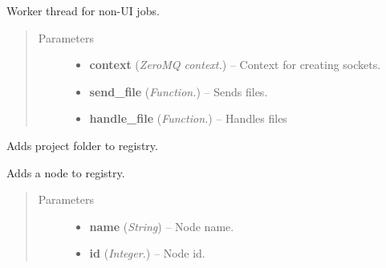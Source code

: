 \documentclass[letterpaper,10pt,english]{sphinxmanual}
\begin{document}
\begin{fulllineitems}
\label{api:wos.WORKER_THREAD}
Worker thread for non-UI jobs.
\begin{quote}\begin{description}
\item[{Parameters}] \leavevmode\begin{itemize}
\item {} 
\textbf{context} (\emph{ZeroMQ context.}) -- Context for creating sockets.

\item {} 
\textbf{send\_file} (\emph{Function.}) -- Sends files.

\item {} 
\textbf{handle\_file} (\emph{Function.}) -- Handles files

\end{itemize}

\end{description}\end{quote}

\begin{fulllineitems}
\label{api:wos.WORKER_THREAD.AddProjectReg}
Adds project folder to registry.

\end{fulllineitems}


\begin{fulllineitems}
\label{api:wos.WORKER_THREAD.AddRegEntry}
Adds a node to registry.
\begin{quote}\begin{description}
\item[{Parameters}] \leavevmode\begin{itemize}
\item {} 
\textbf{name} (\emph{String}) -- Node name.

\item {} 
\textbf{id} (\emph{Integer.}) -- Node id.

\end{itemize}

\end{description}\end{quote}


\end{fulllineitems}
\end{fulllineitems}
\end{document}
